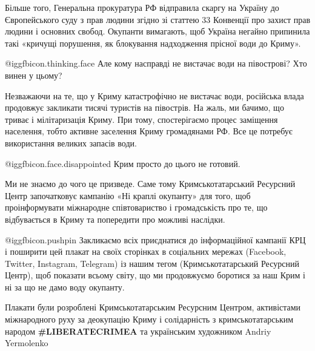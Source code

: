Більше того, Генеральна прокуратура РФ відправила скаргу на Україну до
Європейського суду з прав людини згідно зі статтею 33 Конвенції про захист прав
людини і основних свобод. Окупанти вимагають, щоб Україна негайно припинила
такі «кричущі порушення, як блокування надходження прісної води до Криму».

 @igg{fbicon.thinking.face}  Але кому насправді не вистачає води на півострові? Хто винен у цьому? 

Незважаючи на те, що у Криму катастрофічно не вистачає води, російська влада
продовжує закликати тисячі туристів на півострів. На жаль, ми бачимо, що триває
і мілітаризація Криму. При тому, спостерігаємо процес заміщення населення,
тобто активне заселення Криму громадянами РФ. Все це потребує використання
великих запасів води.

 @igg{fbicon.face.disappointed}  Крим просто до цього не готовий.

Ми не знаємо до чого це призведе. Саме тому Кримськотатарський Ресурсний Центр
започатковує кампанію «Ні краплі окупанту» для того, щоб проінформувати
міжнародне співтовариство і громадськість про те, що відбувається в Криму та
попередити про можливі наслідки.

 @igg{fbicon.pushpin}  Закликаємо всіх приєднатися до інформаційної кампанії КРЦ і поширити цей
плакат на своїх сторінках в соціальних мережах (Facebook, Twitter, Instagram,
Telegram) із нашим тегом (Кримськотатарський Ресурсний Центр), щоб показати
всьому світу, що ми продовжуємо боротися за наш Крим і ні за що не дамо воду
окупанту.

Плакати були розроблені Кримськотатарським Ресурсним Центром, активістами
міжнародного руху за деокупацію Криму і солідарність з кримськотатарським
народом \textbf{\#LIBERATECRIMEA} та українським художником Andriy Yermolenko

